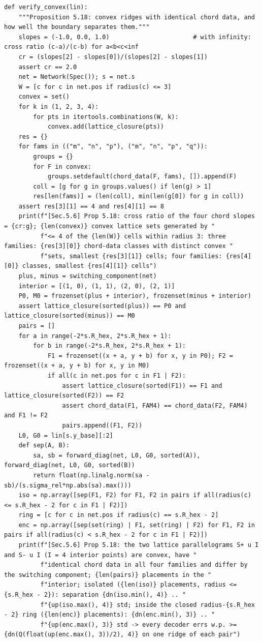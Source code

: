 \documentclass[11pt,a4paper]{article}
\theoremstyle{definition}
\theoremstyle{remark}
\begin{document}
\begin{lstlisting}
def verify_convex(lin):
    """Proposition 5.18: convex ridges with identical chord data, and how well the boundary separates them."""
    slopes = (-1.0, 0.0, 1.0)                       # with infinity: cross ratio (c-a)/(c-b) for a<b<c<inf
    cr = (slopes[2] - slopes[0])/(slopes[2] - slopes[1])
    assert cr == 2.0
    net = Network(Spec()); s = net.s
    W = [c for c in net.pos if radius(c) <= 3]
    convex = set()
    for k in (1, 2, 3, 4):
        for pts in itertools.combinations(W, k):
            convex.add(lattice_closure(pts))
    res = {}
    for fams in (("m", "n", "p"), ("m", "n", "p", "q")):
        groups = {}
        for F in convex:
            groups.setdefault(chord_data(F, fams), []).append(F)
        coll = [g for g in groups.values() if len(g) > 1]
        res[len(fams)] = (len(coll), min(len(g[0]) for g in coll))
    assert res[3][1] == 4 and res[4][1] == 8
    print(f"[Sec.5.6] Prop 5.18: cross ratio of the four chord slopes = {cr:g}; {len(convex)} convex lattice sets generated by "
          f"<= 4 of the {len(W)} cells within radius 3: three families: {res[3][0]} chord-data classes with distinct convex "
          f"sets, smallest {res[3][1]} cells; four families: {res[4][0]} classes, smallest {res[4][1]} cells")
    plus, minus = switching_component(net)
    interior = [(1, 0), (1, 1), (2, 0), (2, 1)]
    P0, M0 = frozenset(plus + interior), frozenset(minus + interior)
    assert lattice_closure(sorted(plus)) == P0 and lattice_closure(sorted(minus)) == M0
    pairs = []
    for a in range(-2*s.R_hex, 2*s.R_hex + 1):
        for b in range(-2*s.R_hex, 2*s.R_hex + 1):
            F1 = frozenset((x + a, y + b) for x, y in P0); F2 = frozenset((x + a, y + b) for x, y in M0)
            if all(c in net.pos for c in F1 | F2):
                assert lattice_closure(sorted(F1)) == F1 and lattice_closure(sorted(F2)) == F2
                assert chord_data(F1, FAM4) == chord_data(F2, FAM4) and F1 != F2
                pairs.append((F1, F2))
    L0, G0 = lin[s.y_base][:2]
    def sep(A, B):
        sa, sb = forward_diag(net, L0, G0, sorted(A)), forward_diag(net, L0, G0, sorted(B))
        return float(np.linalg.norm(sa - sb)/(s.sigma_rel*np.abs(sa).max()))
    iso = np.array([sep(F1, F2) for F1, F2 in pairs if all(radius(c) <= s.R_hex - 2 for c in F1 | F2)])
    ring = [c for c in net.pos if radius(c) == s.R_hex - 2]
    enc = np.array([sep(set(ring) | F1, set(ring) | F2) for F1, F2 in pairs if all(radius(c) < s.R_hex - 2 for c in F1 | F2)])
    print(f"[Sec.5.6] Prop 5.18: the two lattice parallelograms S+ u I and S- u I (I = 4 interior points) are convex, have "
          f"identical chord data in all four families and differ by the switching component; {len(pairs)} placements in the "
          f"interior; isolated ({len(iso)} placements, radius <= {s.R_hex - 2}): separation {dn(iso.min(), 4)} .. "
          f"{up(iso.max(), 4)} std; inside the closed radius-{s.R_hex - 2} ring ({len(enc)} placements): {dn(enc.min(), 3)} .. "
          f"{up(enc.max(), 3)} std -> every decoder errs w.p. >= {dn(Q(float(up(enc.max(), 3))/2), 4)} on one ridge of each pair")



\end{lstlisting}
\end{document}
